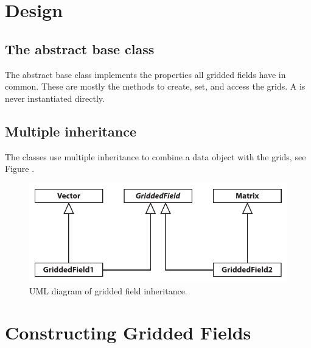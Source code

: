 \section{Design}



\subsection{The abstract base class }

The abstract base class  implements the properties
all gridded fields have in common. These are mostly the methods to create,
set, and access the grids. A  is never instantiated
directly.


\subsection{Multiple inheritance}

The  classes use multiple inheritance to combine a
data object with the grids, see Figure .

\begin{figure}[ht!]
\begin{center}
\includegraphics{Figs/development/griddedfields_inheritance}
\caption{UML diagram of gridded field inheritance.}
\end{center}
\end{figure}


\section{Constructing Gridded Fields}



